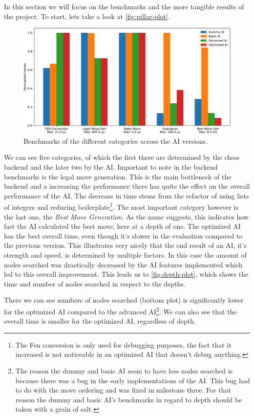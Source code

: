 In this section we will focus on the benchmarks
and the more tangible results of the project.
To start, lets take a look at \autoref{fig:pillar-plot}.

\begin{figure}[hbtp]
	\centering
	\includegraphics[width=.9\linewidth, page=1]{reference/pics/plot.pdf}
	\caption{Benchmarks of the different categories across the AI versions.}
	\label{fig:pillar-plot}
\end{figure}

We can see five categories, of which the first three
are determined by the chess backend and the later two
by the AI.
Important to note in the backend benchmarks is the legal move
generation. This is the main bottleneck of the backend
and a increasing the performance there has quite
the effect on the overall performance of the AI.
The decrease in time stems from the refactor of using
lists of integers and reducing boilerplate\footnote{
The Fen conversion is only used for debugging
purposes, the fact that it increased is not noticeable
in an optimized AI that doesn't debug anything.}.
The most important category however is the last one,
the \textit{Best Move Generation}. As the name suggests,
this indicates how fast the AI calculated the best move,
here at a depth of one.
The optimized AI has the best overall time,
even though it's slower in the evaluation compared to
the previous version. This illustrates very nicely
that the end result of an AI, it's strength and speed,
is determined by multiple factors. In this case
the amount of nodes searched was drastically decreased
by the AI features implemented which led to this
overall improvement. This leads us to \autoref{fig:depth-plot}, which shows
the time and number of nodes searched in respect to the
depths.

There we can see numbers of nodes searched (bottom plot) is significantly
lower for the optimized AI compared to the advanced AI\footnote{
The reason the dummy and basic AI seem to have less nodes searched
is because there was a bug in the early implementations of the AI.
This bug had to do with the move ordering and was fixed in milestone three.
For that reason the dummy and basic AI's benchmarks in regard to depth
should be taken with a grain of salt.
}. We can also see that the overall time is smaller for the optimized AI,
regardless of depth.

